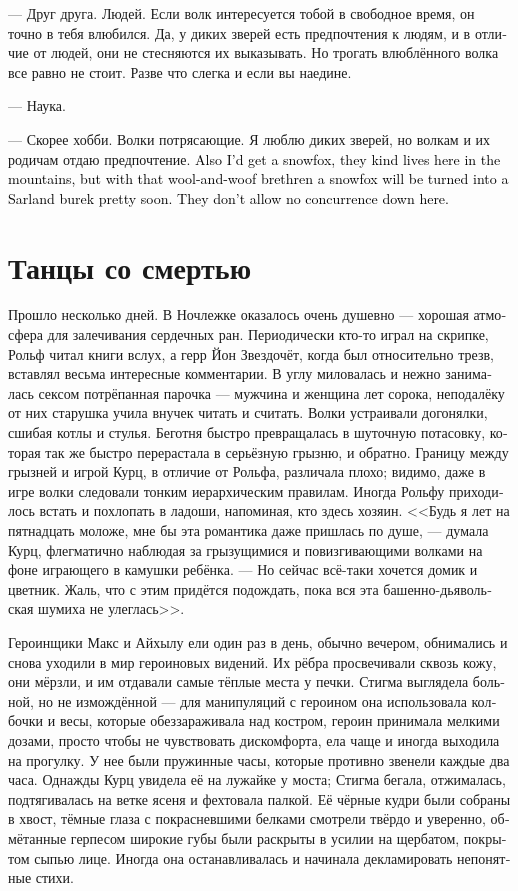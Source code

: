 \documentclass[a4paper,12pt,fleqn]{book}\usepackage{cooltooltips}\usepackage{polyglossia}\setdefaultlanguage[babelshorthands=true]{russian}\setotherlanguage{english}\defaultfontfeatures{Ligatures=TeX,Mapping=tex-text} \usepackage{xcolor}\definecolor{lightgray}{HTML}{bbbbbb}\color{lightgray}\newcommand{\ml}[3]{\textenglish{\textcolor{black}{#3}}}
\begin{document}
--- Друг друга.
Людей.
Если волк интересуется тобой в свободное время, он точно в тебя влюбился.
Да, у диких зверей есть предпочтения к людям, и в отличие от людей, они не стесняются их выказывать.
Но трогать влюблённого волка все равно не стоит.
Разве что слегка и если вы наедине.

--- Наука.

--- Скорее хобби.
Волки потрясающие.
Я люблю диких зверей, но волкам и их родичам отдаю предпочтение.
\ml{$0$}
{Хотел бы ещё завести песца, тут в горах они водятся, но с этой шерстяной братией песец быстро превратится в сарландский бурек.}
{Also I'd get a snowfox, they kind lives here in the mountains, but with that wool-and-woof brethren a snowfox will be turned into a Sarland burek pretty soon.}
\ml{$0$}
{Конкуренции они не терпят.}
{They don't allow no concurrence down here.}

\section{Танцы со смертью}

Прошло несколько дней.
В Ночлежке оказалось очень душевно --- хорошая атмосфера для залечивания сердечных ран.
Периодически кто-то играл на скрипке, Рольф читал книги вслух, а герр Йон Звездочёт, когда был относительно трезв, вставлял весьма интересные комментарии.
В углу миловалась и нежно занималась сексом потрёпанная парочка --- мужчина и женщина лет сорока, неподалёку от них старушка учила внучек читать и считать.
Волки устраивали догонялки, сшибая котлы и стулья.
Беготня быстро превращалась в шуточную потасовку, которая так же быстро перерастала в серьёзную грызню, и обратно.
Границу между грызней и игрой Курц, в отличие от Рольфа, различала плохо;
видимо, даже в игре волки следовали тонким иерархическим правилам.
Иногда Рольфу приходилось встать и похлопать в ладоши, напоминая, кто здесь хозяин.
<<Будь я лет на пятнадцать моложе, мне бы эта романтика даже пришлась по душе, --- думала Курц, флегматично наблюдая за грызущимися и повизгивающими волками на фоне играющего в камушки ребёнка.
--- Но сейчас всё-таки хочется домик и цветник.
Жаль, что с этим придётся подождать, пока вся эта башенно-дьявольская шумиха не улеглась>>.

Героинщики Макс и Айхылу ели один раз в день, обычно вечером, обнимались и снова уходили в мир героиновых видений.
Их рёбра просвечивали сквозь кожу, они мёрзли, и им отдавали самые тёплые места у печки.
Стигма выглядела больной, но не измождённой --- для манипуляций с героином она использовала колбочки и весы, которые обеззараживала над костром, героин принимала мелкими дозами, просто чтобы не чувствовать дискомфорта, ела чаще и иногда выходила на прогулку.
У нее были пружинные часы, которые противно звенели каждые два часа.
Однажды Курц увидела её на лужайке у моста;
Стигма бегала, отжималась, подтягивалась на ветке ясеня и фехтовала палкой.
Её чёрные кудри были собраны в хвост, тёмные глаза с покрасневшими белками смотрели твёрдо и уверенно, обмётанные герпесом широкие губы были раскрыты в усилии на щербатом, покрытом сыпью лице.
Иногда она останавливалась и начинала декламировать непонятные стихи.
\end{document}
